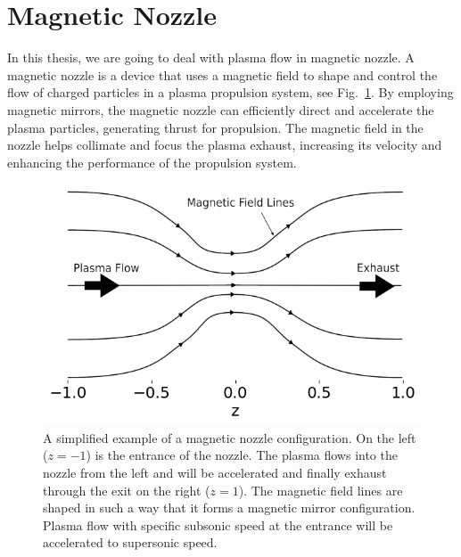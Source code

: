 \section{Magnetic Nozzle}
In this thesis, we are going to deal with plasma flow in magnetic nozzle.
A magnetic nozzle is a device that uses a magnetic field to shape and control the flow of charged particles in a plasma propulsion system, see Fig.~\ref{fig:magnetic-nozzle}. By employing magnetic mirrors, the magnetic nozzle can efficiently direct and accelerate the plasma particles, generating thrust for propulsion. The magnetic field in the nozzle helps collimate and focus the plasma exhaust, increasing its velocity and enhancing the performance of the propulsion system.

\begin{figure}[htbp]
	\centering
	\includegraphics[width=0.7\linewidth]{figures/magnetic-nozzle.png}
	\caption{A simplified example of a magnetic nozzle configuration. On the left ($z=-1$) is the entrance of the nozzle. The plasma flows into the nozzle from the left and will be accelerated and finally exhaust through the exit on the right ($z=1$). The magnetic field lines are shaped in such a way that it forms a magnetic mirror configuration. Plasma flow with specific subsonic speed at the entrance will be accelerated to supersonic speed.}
	\label{fig:magnetic-nozzle}
\end{figure}


